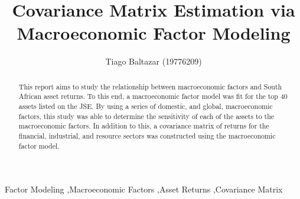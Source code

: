 \documentclass[11pt,preprint, authoryear]{elsarticle}
\numberwithin{equation}{section}
\numberwithin{figure}{section}
\numberwithin{table}{section}
\begin{document}
\begin{frontmatter}  %

\title{Covariance Matrix Estimation via Macroeconomic Factor Modeling}





\author[Add1]{Tiago Baltazar (19776209)}





\address[Add1]{Stellenbosch University, Western Cape, South Africa}


\begin{abstract}
\small{
This report aims to study the relationship between macroeconomic factors
and South African asset returns. To this end, a macroeconomic factor
model was fit for the top 40 assets listed on the JSE. By using a series
of domestic, and global, macroeconomic factors, this study was able to
determine the sensitivity of each of the assets to the macroeconomic
factors. In addition to this, a covariance matrix of returns for the
financial, industrial, and resource sectors was constructed using the
macroeconomic factor model.
}
\end{abstract}

\vspace{1cm}


\begin{keyword}
\footnotesize{
Factor Modeling \sep Macroeconomic Factors \sep Asset Returns
\sep Covariance Matrix \\
\vspace{0.3cm}
}
\end{keyword}



\vspace{0.5cm}

\end{frontmatter}



\pagestyle{fancy}
\chead{}
\lfoot{}
\lhead{\leftmark}
\cfoot{}


\headsep 35pt %
\end{document}
